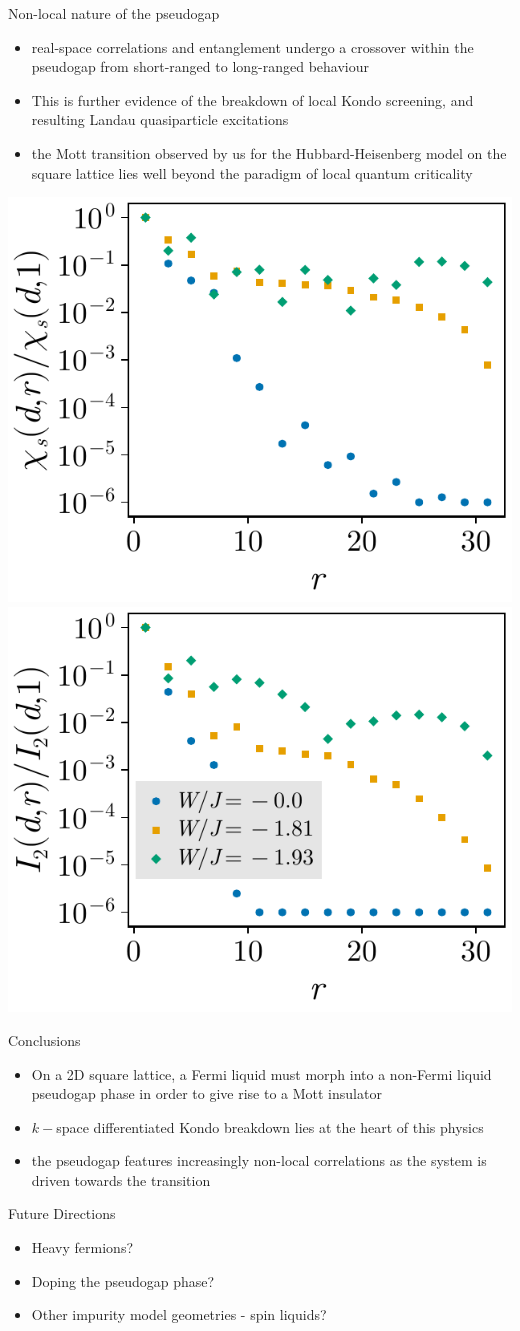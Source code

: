 \documentclass[10pt,aspectratio=169]{beamer}
\begin{document}
\begin{frame}{Non-local nature of the pseudogap}
\begin{itemize}
	\item real-space correlations and entanglement undergo a crossover within the pseudogap from short-ranged to \alert{long-ranged} behaviour\\[5pt]
	\item This is further evidence of the \alert{breakdown of local Kondo screening}, and resulting Landau quasiparticle excitations\\[5pt]
	\item the Mott transition observed by us for the Hubbard-Heisenberg model on the square lattice lies well beyond the paradigm of \alert{local quantum criticality}
\end{itemize}

\begin{center}
    \includegraphics[width=0.35\linewidth]{SF-di_69-2000.pdf}
    \includegraphics[width=0.35\linewidth]{I2-di_69-2000.pdf}
\end{center}
\end{frame}

\begin{frame}{Conclusions}
	\begin{itemize}
		\item On a 2D square lattice, a Fermi liquid must morph into a \alert{non-Fermi liquid pseudogap phase} in order to give rise to a Mott insulator
		\item $k-$space differentiated \alert{Kondo breakdown} lies at the heart of this physics
		\item the pseudogap features increasingly \alert{non-local correlations} as the system is driven towards the transition
	\end{itemize}

	\vfill
	{\large \alert{Future Directions}}
	\begin{itemize}
		\item Heavy fermions?
		\item Doping the pseudogap phase?
		\item Other impurity model geometries - spin liquids?
	\end{itemize}

\end{frame}
\end{document}
